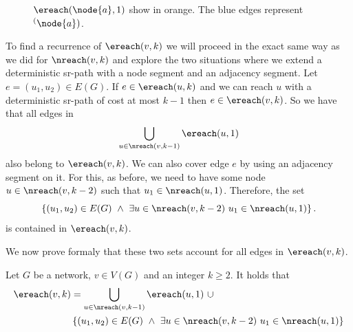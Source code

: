 \begin{figure}[H]
\begin{center}
\begin{tikzpicture}


\end{tikzpicture}
\end{center}
\label{fig:ereach1}
\caption{$\ereach(\node{a}, 1)$ show in orange. The blue edges represent $\sp(\node{a})$.}
\end{figure}

To find a recurrence of $\ereach(v, k)$ we will proceed in the exact same way as we did for
$\nreach(v, k)$ and  explore the two situations where we extend a deterministic sr-path
with a node segment and an adjacency segment. Let $e = (u_1, u_2) \in E(G)$. If 
$e \in \ereach(u, k)$ and we can reach $u$ with a deterministic sr-path of cost
at most $k - 1$ then $e \in \ereach(v, k)$. So we have that all edges in
$$
\bigcup_{u \in \nreach(v, k - 1)} \ereach(u, 1)
$$
also belong to $\ereach(v, k)$.
We can also cover edge $e$ by using an adjacency segment on it. For this, as before, we need to
have some node $u \in \nreach(v, k - 2)$ such that $u_1 \in \nreach(u, 1)$. 
Therefore, the set
$$
\left\{ (u_1, u_2) \in E(G) \ \wedge \ \exists u \in \nreach(v, k - 2) \ u_1 \in \nreach(u, 1) \right\}.
$$
is contained in $\ereach(v, k)$.

We now prove formaly that these two sets account for all edges in $\ereach(v, k)$.

\begin{theorem}
\label{thm:ereach}
Let $G$ be a network, $v \in V(G)$ and an integer $k \geq 2$. It holds that
\begin{align*}
\ereach(v, k) & = \bigcup_{u \in \nreach(v, k - 1)} \ereach(u, 1) \ \cup \\ 
& \left\{ (u_1, u_2) \in E(G) \ \wedge \ \exists u \in \nreach(v, k - 2) \ u_1 \in \nreach(u, 1) \right\}
\end{align*}
\end{theorem}

